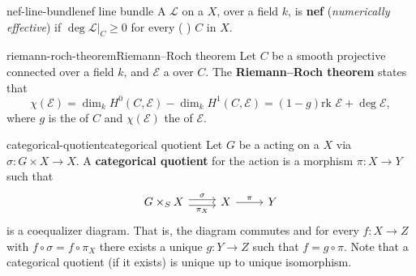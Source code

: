 \begin{topic}{nef-line-bundle}{nef line bundle}
    A  $\mathcal{L}$ on a  $X$,  over a field $k$, is \textbf{nef} (\textit{numerically effective}) if $\deg \mathcal{L}|_C \ge 0$ for every ( )  $C$ in $X$.
\end{topic}

\begin{topic}{riemann-roch-theorem}{Riemann--Roch theorem}
    Let $C$ be a smooth projective connected  over a field $k$, and $\mathcal{E}$ a  over $C$. The \textbf{Riemann--Roch theorem} states that
    \[ \chi(\mathcal{E}) = \dim_k H^0(C, \mathcal{E}) - \dim_k H^1(C, \mathcal{E}) = (1 - g) \text{rk } \mathcal{E} + \deg \mathcal{E} , \]
    where $g$ is the  of $C$ and $\chi(\mathcal{E})$ the  of $\mathcal{E}$.
\end{topic}

\begin{topic}{categorical-quotient}{categorical quotient}
    Let $G$ be a  acting on a  $X$ via $\sigma : G \times X \to X$. A \textbf{categorical quotient} for the action is a morphism $\pi : X \to Y$ such that
    \[ \begin{tikzcd} G \times_S X \arrow[shift left=0.25em]{r}{\sigma} \arrow[swap,shift right=0.25em]{r}{\pi_X} & X \arrow{r}{\pi} & Y \end{tikzcd} \]
    is a coequalizer diagram. That is, the diagram commutes and for every $f : X \to Z$ with $f \circ \sigma = f \circ \pi_X$ there exists a unique $g : Y \to Z$ such that $f = g \circ \pi$. Note that a categorical quotient (if it exists) is unique up to unique isomorphism.
\end{topic}

